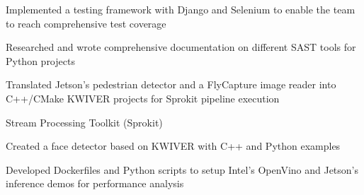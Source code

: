 \documentclass[]{deedy-resume-openfont}
\begin{document}
\begin{minipage}[t]{0.7\textwidth}
\begin{tightemize}
\item Implemented a testing framework with Django and Selenium to enable the team to reach comprehensive test coverage
\item Researched and wrote comprehensive documentation on different SAST tools for Python projects
\end{tightemize}
\sectionsep

\begin{tightemize}
\item Translated Jetson's pedestrian detector and a FlyCapture image reader into C++/CMake KWIVER projects for Sprokit pipeline execution
    \vspace{3pt}
    \begin{tightemize}
    \item Stream Processing Toolkit (Sprokit)
    \end{tightemize}
    \vspace{5pt}
\item Created a face detector based on KWIVER with C++ and Python examples
\item Developed Dockerfiles and Python scripts to setup Intel's OpenVino and Jetson's inference demos for performance analysis

\end{tightemize}
\sectionsep



\end{minipage}
\end{document}

